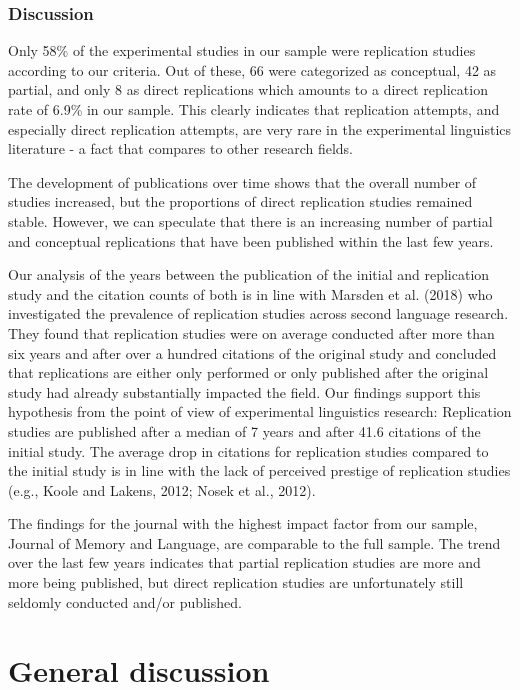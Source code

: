 \documentclass[]{elsarticle} %
\begin{document}
\hypertarget{discussion-1}{%
\subsubsection{Discussion}\label{discussion-1}}

Only 58\% of the experimental studies in our sample were replication
studies according to our criteria. Out of these, 66 were categorized as
conceptual, 42 as partial, and only 8 as direct replications which
amounts to a direct replication rate of 6.9\% in our sample. This
clearly indicates that replication attempts, and especially direct
replication attempts, are very rare in the experimental linguistics
literature - a fact that compares to other research fields.

The development of publications over time shows that the overall number
of studies increased, but the proportions of direct replication studies
remained stable. However, we can speculate that there is an increasing
number of partial and conceptual replications that have been published
within the last few years.

Our analysis of the years between the publication of the initial and
replication study and the citation counts of both is in line with
Marsden et al. (2018) who investigated the prevalence of replication
studies across second language research. They found that replication
studies were on average conducted after more than six years and after
over a hundred citations of the original study and concluded that
replications are either only performed or only published after the
original study had already substantially impacted the field. Our
findings support this hypothesis from the point of view of experimental
linguistics research: Replication studies are published after a median
of 7 years and after 41.6 citations of the initial study. The average
drop in citations for replication studies compared to the initial study
is in line with the lack of perceived prestige of replication studies
(e.g., Koole and Lakens, 2012; Nosek et al., 2012).

The findings for the journal with the highest impact factor from our
sample, Journal of Memory and Language, are comparable to the full
sample. The trend over the last few years indicates that partial
replication studies are more and more being published, but direct
replication studies are unfortunately still seldomly conducted and/or
published.

\hypertarget{general-discussion}{%
\section{General discussion}\label{general-discussion}}
\end{document}
